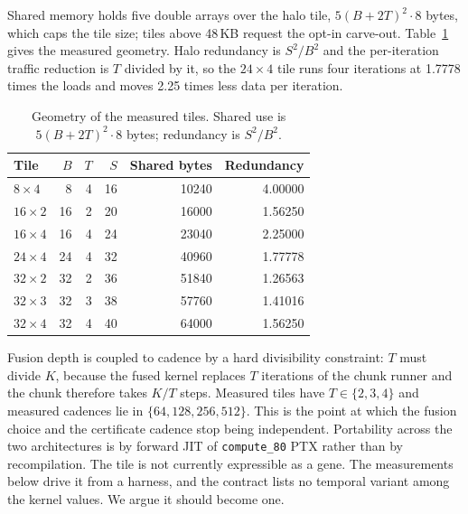 Shared memory holds five double arrays over the halo tile, $5(B+2T)^2 \cdot 8$
bytes, which caps the tile size; tiles above 48\,KB request the opt-in
carve-out. Table~\ref{tab:tiles} gives the measured geometry. Halo redundancy is
$S^2/B^2$ and the per-iteration traffic reduction is $T$ divided by it, so the
$24\times4$ tile runs four iterations at 1.7778 times the loads and moves 2.25
times less data per iteration.

\begin{table}[t]
\centering
\caption{Geometry of the measured tiles. Shared use is $5(B+2T)^2 \cdot 8$
bytes; redundancy is $S^2/B^2$.}
\label{tab:tiles}
\begin{tabular}{@{}lrrrrr@{}}
\toprule
Tile & $B$ & $T$ & $S$ & Shared bytes & Redundancy \\
\midrule
$8\times4$  &  8 & 4 & 16 & 10240 & 4.00000 \\
$16\times2$ & 16 & 2 & 20 & 16000 & 1.56250 \\
$16\times4$ & 16 & 4 & 24 & 23040 & 2.25000 \\
$24\times4$ & 24 & 4 & 32 & 40960 & 1.77778 \\
$32\times2$ & 32 & 2 & 36 & 51840 & 1.26563 \\
$32\times3$ & 32 & 3 & 38 & 57760 & 1.41016 \\
$32\times4$ & 32 & 4 & 40 & 64000 & 1.56250 \\
\bottomrule
\end{tabular}
\end{table}

Fusion depth is coupled to cadence by a hard divisibility constraint: $T$ must
divide $K$, because the fused kernel replaces $T$ iterations of the chunk runner
and the chunk therefore takes $K/T$ steps. Measured tiles have
$T \in \{2,3,4\}$ and measured cadences lie in $\{64,128,256,512\}$. This is the
point at which the fusion choice and the certificate cadence stop being
independent. Portability across the two architectures is by forward JIT of
\texttt{compute\_80} PTX rather than by recompilation.
The tile is not currently expressible as a gene. The measurements below drive it
from a harness, and the contract lists no temporal variant among the kernel
values. We argue it should become one.

